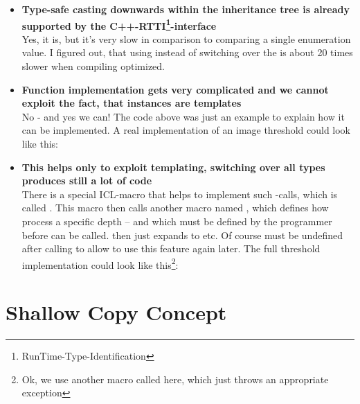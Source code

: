 \begin{itemize}
\item \textbf{Type-safe casting downwards within the inheritance tree is already supported by the C++-RTTI\footnote{RunTime-Type-Identification}-interface}\\
Yes, it is, but it's very slow in comparison to comparing a single enumeration value. I figured out, that using  instead of switching over the  is about 20 times slower when compiling optimized.

\item \textbf{Function implementation gets very complicated and we cannot exploit the fact, that  instances are templates}\\
No - and yes we can! The code above was just an example to explain how it can be implemented. A real implementation of an image threshold could look like this:


\item \textbf{This helps only to exploit templating, switching over all types produces still a lot of code}\\
There is a special ICL-macro that helps to implement such -calls, which is called . This macro then calls another macro named , which defines how process a specific depth -- and which must be defined by the programmer before  can be called.  then just expands to    etc. Of course  must be undefined after calling  to allow to use this feature again later. The full threshold implementation could look like this\footnote{Ok, we use another macro called  here, which just throws an appropriate exception}:


\end{itemize}

\section {Shallow Copy Concept}

